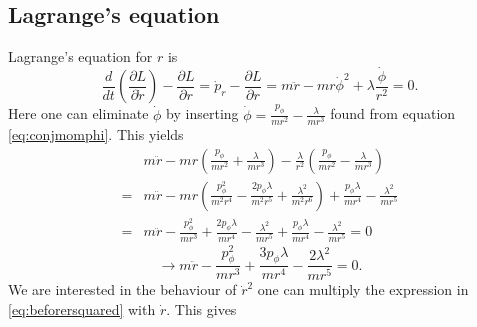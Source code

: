 \documentclass[11pt]{amsart}
\begin{document}
\subsection{Lagrange's equation}
Lagrange's equation for $r$ is
\begin{equation}
\frac{d}{dt}\left(\frac{\partial L}{\partial \dot{r}}\right) - \frac{\partial L}{\partial r} = \dot{p}_r - \frac{\partial L}{\partial r} = m\ddot{r} - mr\dot{\phi}^2 + \lambda\frac{\dot{\phi}}{r^2} = 0.
\end{equation}
Here one can eliminate $\dot{\phi}$ by inserting $\dot{\phi} = \frac{p_\phi}{mr^2} - \frac{\lambda}{mr^3}$ found from equation \ref{eq:conjmomphi}. This yields
\begin{align*}
& m\ddot{r} - mr\left(\frac{p_\phi}{mr^2} + \frac{\lambda}{mr^3} \right) - \frac{\lambda}{r^2}\left(\frac{p_\phi}{mr^2} - \frac{\lambda}{mr^3}\right) \\
=& m\ddot{r} - mr\left(\frac{p_\phi^2}{m^2r^4} - \frac{2p_\phi\lambda}{m^2r^5} + \frac{\lambda^2}{m^2r^6}\right) + \frac{p_\phi\lambda}{mr^4} - \frac{\lambda^2}{mr^5} \\
=& m\ddot{r} - \frac{p_\phi^2}{mr^3} + \frac{2p_\phi\lambda}{mr^4} - \frac{\lambda^2}{mr^5} + \frac{p_\phi\lambda}{mr^4} - \frac{\lambda^2}{mr^5} = 0
\end{align*}
\begin{equation}
\label{eq:beforersquared}
\rightarrow m\ddot{r} - \frac{p_\phi^2}{mr^3} + \frac{3p_\phi\lambda}{mr^4} - \frac{2\lambda^2}{mr^5} = 0.
\end{equation}
We are interested in the behaviour of $\dot{r}^2$ one can multiply the expression in \ref{eq:beforersquared} with $\dot{r}$. This gives
\end{document}
